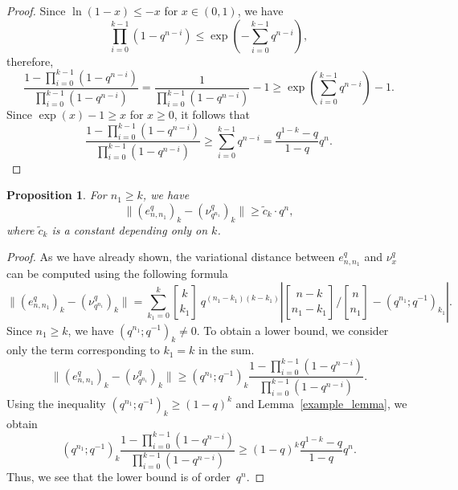 \documentclass[12pt, a4paper]{amsart}
\numberwithin{equation}{subsection}
\newtheorem{prop}[equation]{Proposition}
\theoremstyle{definition}
\newcommand{\qbinom}[3]{\genfrac{[}{]}{0pt}{}{#1}{#2}_{#3}}
\begin{document}
\begin{proof}
Since $\ln(1 - x) \leqslant -x$ for $x \in (0,1)$, we have
\begin{equation}
\prod_{i=0}^{k-1}(1 - q^{n - i}) \leqslant \exp\left(-\sum_{i=0}^{k-1}q^{n-i}\right),
\end{equation}
therefore,
\begin{equation}
\dfrac{1 - \prod_{i=0}^{k-1}(1 - q^{n - i})}{\prod_{i=0}^{k-1}(1 - q^{n - i})} = \dfrac{1}{\prod_{i=0}^{k-1}(1 - q^{n - i})} - 1 \geqslant \exp\left(\sum_{i=0}^{k-1}q^{n-i}\right) - 1.
\end{equation}
Since $\exp(x) - 1 \geqslant x$ for $x \geqslant 0$, it follows that
\begin{equation}
\dfrac{1 - \prod_{i=0}^{k-1}(1 - q^{n - i})}{\prod_{i=0}^{k-1}(1 - q^{n - i})} \geqslant \sum_{i=0}^{k-1}q^{n-i} = \dfrac{q^{1-k}-q}{1-q} q^{n}.
\end{equation}
\end{proof}
\begin{prop}
For $n_{1} \geqslant k$, we have 
\begin{equation}
\big\| (e^{q}_{n, n_1})_k - (\nu^{q}_{q^{n_{1}}})_k \big\| \geqslant  \tilde{c}_{k}\cdot q^{n},
\end{equation}
where $\tilde{c}_{k}$ is a constant depending only on $k$.
\end{prop}
\begin{proof}
As we have already shown, the variational distance between  \( e^{q}_{n, n_1} \) and \( \nu^{q}_{x} \) can be computed using the following formula
\begin{equation*}
\big\| (e^{q}_{n, n_1})_k - (\nu^{q}_{q^{n_{1}}})_k \big\| 
= \sum_{k_1 = 0}^{k} \qbinom{k}{k_1}{} \, q^{(n_1 - k_1)(k - k_1)}
\left| \qbinom{n-k}{n_{1}-k_{1}}{} \bigg/ \qbinom{n}{n_{1}}{}  
- (q^{n_1}; q^{-1})_{k_1} \right|.
\end{equation*}
Since $n_{1} \geqslant k$, we have $(q^{n_{1}}; q^{-1})_{k} \neq 0$. To obtain a lower bound, we consider only the term corresponding to $k_1 = k$ in the sum.
\begin{equation*}
\big\| (e^{q}_{n, n_1})_k - (\nu^{q}_{q^{n_{1}}})_k \big\|  \geqslant  (q^{n_{1}}; q^{-1})_{k}  \dfrac{1 - \prod_{i=0}^{k-1}(1 - q^{n - i})}{\prod_{i=0}^{k-1}(1 - q^{n - i})}.
\end{equation*}
Using the inequality $(q^{n_{1}}; q^{-1})_{k} \geqslant (1-q)^{k}$ and Lemma~\eqref{example_lemma}, we obtain
\begin{equation}
(q^{n_{1}}; q^{-1})_{k} \dfrac{1 - \prod_{i=0}^{k-1}(1 - q^{n - i})}{\prod_{i=0}^{k-1}(1 - q^{n - i})} \geqslant (1-q)^{k}  \dfrac{q^{1-k}-q}{1-q} q^{n}.
\end{equation}
Thus, we see that the lower bound is of order~$q^{n}$.
\end{proof}



\end{document}
